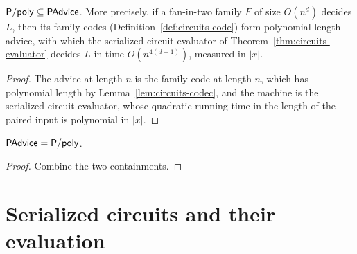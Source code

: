 \begin{theorem}
  \label{thm:circuits-ppoly-subset-padvice}
  \leanok
  $\mathsf{P/poly} \subseteq \mathsf{PAdvice}$. More precisely, if a fan-in-two family
  $F$ of size $O(n^d)$ decides $L$, then its family codes
  (Definition~\ref{def:circuits-code}) form polynomial-length advice, with
  which the serialized circuit evaluator of
  Theorem~\ref{thm:circuits-evaluator} decides $L$ in time $O(n^{4(d+1)})$,
  measured in $|x|$.
\end{theorem}
\begin{proof}
  \leanok
  The advice at length $n$ is the family code at length $n$, which has
  polynomial length by Lemma~\ref{lem:circuits-codec}, and the machine is the
  serialized circuit evaluator, whose quadratic running time in the length of
  the paired input is polynomial in $|x|$.
\end{proof}

\begin{corollary}
  \label{cor:circuits-padvice-eq-ppoly}
  \leanok
  $\mathsf{PAdvice} = \mathsf{P/poly}$.
\end{corollary}
\begin{proof}
  \leanok
  Combine the two containments.
\end{proof}

\section{Serialized circuits and their evaluation}
\label{sec:circuits-codes}

